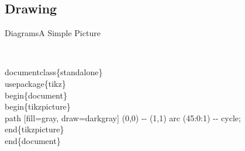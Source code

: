 \subsection{Drawing}

\begin{frame}[fragile]{Diagrams}{A Simple \Tikz{} Picture}
  \begin{columns}
    \begin{column}{.75\linewidth}
\begin{semiverbatim}
\\documentclass\{standalone\}
\alert<1>{\\usepackage\{tikz\}}
\\begin\{document\}
\alert<2>{\\begin\{tikzpicture\}}
\alert<3>{\\path [fill=gray, draw=darkgray] 
  (0,0) -{}- (1,1) arc (45:0:1) -{}- cycle;}
\alert<2>{\\end\{tikzpicture\}}
\\end\{document\}
\end{semiverbatim}
    \end{column}%
    \begin{column}{.25\linewidth}
    \end{column}
  \end{columns}
\end{frame}
